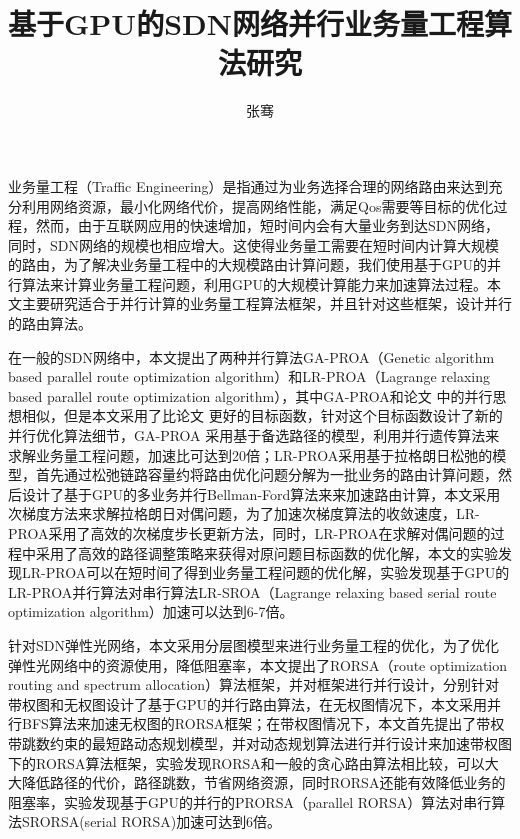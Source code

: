 \documentclass[master]{thesis-uestc}
\title{基于GPU的SDN网络并行业务量工程算法研究}
\author{张骞}
\begin{document}
\begin{chineseabstract}
业务量工程（Traffic Engineering）是指通过为业务选择合理的网络路由来达到充分利用网络资源，最小化网络代价，提高网络性能，满足Qos需要等目标的优化过程，然而，由于互联网应用的快速增加，短时间内会有大量业务到达SDN网络，同时，SDN网络的规模也相应增大。这使得业务量工需要在短时间内计算大规模的路由，为了解决业务量工程中的大规模路由计算问题，我们使用基于GPU的并行算法来计算业务量工程问题，利用GPU的大规模计算能力来加速算法过程。本文主要研究适合于并行计算的业务量工程算法框架，并且针对这些框架，设计并行的路由算法。

在一般的SDN网络中，本文提出了两种并行算法GA-PROA（Genetic algorithm based parallel route optimization algorithm）和LR-PROA（Lagrange relaxing based parallel route optimization algorithm），其中GA-PROA和论文 \cite{ParaTE2}中的并行思想相似，但是本文采用了比论文 \cite{ParaTE2}更好的目标函数，针对这个目标函数设计了新的并行优化算法细节，GA-PROA
采用基于备选路径的模型，利用并行遗传算法来求解业务量工程问题，加速比可达到20倍；LR-PROA采用基于拉格朗日松弛的模型，首先通过松弛链路容量约将路由优化问题分解为一批业务的路由计算问题，然后设计了基于GPU的多业务并行Bellman-Ford算法来来加速路由计算，本文采用次梯度方法来求解拉格朗日对偶问题，为了加速次梯度算法的收敛速度，LR-PROA采用了高效的次梯度步长更新方法，同时，LR-PROA在求解对偶问题的过程中采用了高效的路径调整策略来获得对原问题目标函数的优化解，本文的实验发现LR-PROA可以在短时间了得到业务量工程问题的优化解，实验发现基于GPU的LR-PROA并行算法对串行算法LR-SROA（Lagrange relaxing based serial route optimization algorithm）加速可以达到6-7倍。

针对SDN弹性光网络，本文采用分层图模型来进行业务量工程的优化，为了优化弹性光网络中的资源使用，降低阻塞率，本文提出了RORSA（route optimization routing and spectrum allocation）算法框架，并对框架进行并行设计，分别针对带权图和无权图设计了基于GPU的并行路由算法，在无权图情况下，本文采用并行BFS算法来加速无权图的RORSA框架；在带权图情况下，本文首先提出了带权带跳数约束的最短路动态规划模型，并对动态规划算法进行并行设计来加速带权图下的RORSA算法框架，实验发现RORSA和一般的贪心路由算法相比较，可以大大降低路径的代价，路径跳数，节省网络资源，同时RORSA还能有效降低业务的阻塞率，实验发现基于GPU的并行的PRORSA（parallel RORSA）算法对串行算法SRORSA(serial RORSA)加速可达到6倍。

\end{chineseabstract}
\end{document}
